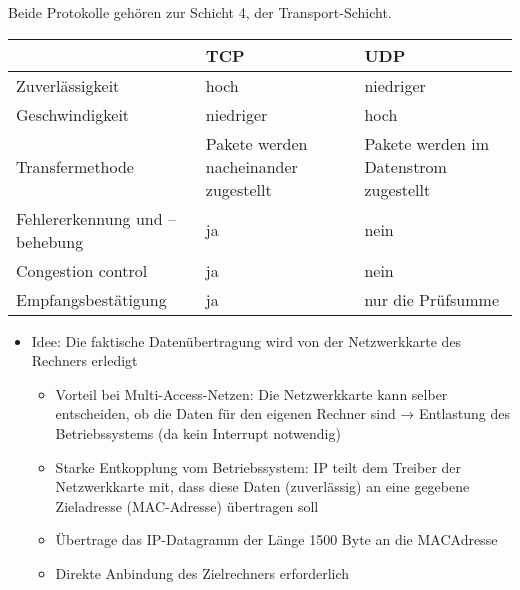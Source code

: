 Beide Protokolle gehören zur Schicht 4, der Transport-Schicht.
\bigbreak
\begin{center}
    \begin{tabularx}{\textwidth}{|X|X|X|}
        \hline
        & TCP & UDP \tabularnewline
        \hline
        Zuverlässigkeit & hoch & niedriger \tabularnewline
        \hline
        Geschwindigkeit & niedriger & hoch \tabularnewline
        \hline
        Transfermethode & Pakete werden nacheinander zugestellt & Pakete werden im Datenstrom zugestellt \tabularnewline
        \hline
        Fehlererkennung und – behebung & ja & nein \tabularnewline
        \hline
        Congestion control & ja & nein \tabularnewline
        \hline
        Empfangsbestätigung & ja & nur die Prüfsumme \tabularnewline
        \hline
    \end{tabularx}
\end{center}

\begin{itemize}
    \item Idee: Die faktische Datenübertragung wird von der Netzwerkkarte des Rechners erledigt
    \begin{itemize}
        \item Vorteil bei Multi-Access-Netzen: Die Netzwerkkarte kann selber entscheiden, ob die Daten für den eigenen Rechner sind
        → Entlastung des Betriebssystems (da kein Interrupt notwendig)
        \item Starke Entkopplung vom Betriebssystem: IP teilt dem Treiber der Netzwerkkarte mit, dass diese Daten (zuverlässig) an eine gegebene Zieladresse (MAC-Adresse) übertragen soll
        \item Übertrage das IP-Datagramm der Länge 1500 Byte an die MACAdresse
        \item Direkte Anbindung des Zielrechners erforderlich
    \end{itemize}
\end{itemize}